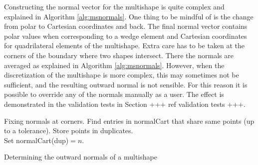Constructing the normal vector for the multishape is quite complex and explained in Algorithm \ref{alg:msnormals}. One thing to be mindful of is the change from polar to Cartesian coordinates and back. The final normal vector contains polar values when corresponding to a wedge element and Cartesian coordinates for quadrilateral elements of the multishape. Extra care has to be taken at the corners of the boundary where two shapes intersect. There the normals are averaged as explained in Algorithm \ref{alg:msnormals}. However, when the discretization of the multishape is more complex, this may sometimes not be sufficient, and the resulting outward normal is not sensible. For this reason it is possible to override any of the normals manually as a user. The effect is demonstrated in the validation tests in Section +++ ref validation tests +++.
\\
\begin{algorithm}[H]
	\SetAlgoLined
	
	Fixing normals at corners. Find entries in normalCart that share same points (up to a tolerance). Store points in duplicates. \\
	Set normalCart(dup)$ = n $. \\
	
	\caption{Determining the outward normals of a multishape}
	\label{alg:msnormals}
\end{algorithm}


